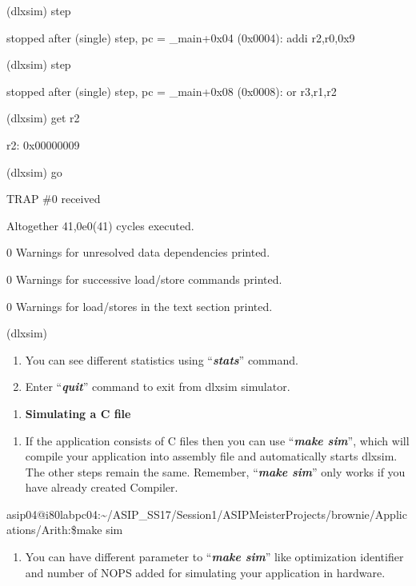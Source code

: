 \documentclass[
]{article}
\begin{document}
(dlxsim) step

stopped after (single) step, pc = \_main+0x04 (0x0004): addi r2,r0,0x9

(dlxsim) step

stopped after (single) step, pc = \_main+0x08 (0x0008): or r3,r1,r2

(dlxsim) get r2

r2: 0x00000009

(dlxsim) go

TRAP \#0 received

Altogether 41,0e0(41) cycles executed.

0 Warnings for unresolved data dependencies printed.

0 Warnings for successive load/store commands printed.

0 Warnings for load/stores in the text section printed.

(dlxsim)

\begin{enumerate}
\def\labelenumi{\arabic{enumi}.}
\setcounter{enumi}{6}
\item
  You can see different statistics using ``\emph{\textbf{stats}}''
  command.
\item
  Enter ``\emph{\textbf{quit}}'' command to exit from dlxsim simulator.
\end{enumerate}

\begin{enumerate}
\def\labelenumi{\Alph{enumi}.}
\setcounter{enumi}{1}
\item
  \textbf{Simulating a C file}
\end{enumerate}

\begin{enumerate}
\def\labelenumi{\arabic{enumi}.}
\setcounter{enumi}{8}
\item
  If the application consists of C files then you can use
  ``\emph{\textbf{make sim}}'', which will compile your application into
  assembly file and automatically starts dlxsim. The other steps remain
  the same. Remember, ``\emph{\textbf{make sim}}'' only works if you
  have already created Compiler.
\end{enumerate}

asip04@i80labpc04:\textasciitilde/ASIP\_SS17/Session1/ASIPMeisterProjects/brownie/Applications/Arith:\$make
sim

\begin{enumerate}
\def\labelenumi{\arabic{enumi}.}
\setcounter{enumi}{9}
\item
  You can have different parameter to ``\emph{\textbf{make sim}}'' like
  optimization identifier and number of NOPS added for simulating your
  application in hardware.
\end{enumerate}
\end{document}
